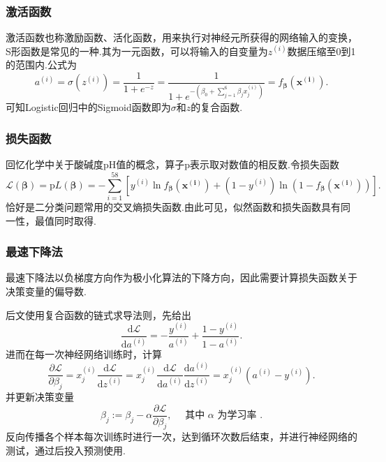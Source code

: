 \subsubsection{激活函数}

激活函数也称激励函数、活化函数，用来执行对神经元所获得的网络输入的变换，S形函数是常见的一种.其为一元函数，可以将输入的自变量为$z^{(i)}$数据压缩至0到1的范围内.公式为
\begin{equation}
	a^{(i)} = \sigma (z^{(i)}) = \frac{1}{1 + e^{- z}} = \frac{1}{1 + e^{-
   \left( \beta_0 + \sum^6_{j = 1} \beta_j x^{(i)}_j \right)}} =
   f_{\boldsymbol{\beta}} (\boldsymbol{x^{(i)}}).
\end{equation}
可知Logistic回归中的Sigmoid函数即为$\sigma$和$z$的复合函数.

\subsubsection{损失函数}

回忆化学中关于酸碱度pH值的概念，算子p表示取对数值的相反数.令损失函数
\begin{equation}
	\mathcal{L} (\boldsymbol{\beta}) = \mathrm{p} \textit{L$(\boldsymbol{\beta})$}
   = - \sum_{i = 1}^{58} [y^{(i)} \ln f_{\boldsymbol{\beta}}
   (\boldsymbol{x^{(i)}}) + (1 - y^{(i)}) \ln (1 - f_{\boldsymbol{\beta}}
   (\boldsymbol{x^{(i)}}))].
\end{equation}
恰好是二分类问题常用的交叉熵损失函数.由此可见，似然函数和损失函数具有同一性，最值同时取得.

\subsubsection{最速下降法}

最速下降法以负梯度方向作为极小化算法的下降方向，因此需要计算损失函数关于决策变量的偏导数.

后文使用复合函数的链式求导法则，先给出
\begin{equation}
	\frac{\mathrm{d} \mathcal{L}}{\mathrm{d} a^{(i)}} = -
   \frac{y^{(i)}}{a^{(i)}} + \frac{1 - y^{(i)}}{1 - a^{(i)}}.
\end{equation}
进而在每一次神经网络训练时，计算
\begin{equation}
	\frac{\partial \mathcal{L}}{\partial \beta_j} = x^{(i)}_j \frac{\mathrm{d}
   \mathcal{L}}{\mathrm{d}z^{(i)}} = x^{(i)}_j \frac{\mathrm{d}
   \mathcal{L}}{\mathrm{d} a^{(i)}} \frac{\mathrm{d} a^{(i)}}{\mathrm{d}z^{(i)}}
   = x^{(i)}_j (a^{(i)} - y^{(i)}).
\end{equation}
并更新决策变量
\begin{equation}
	\beta_{j}:=\beta_{j}-\alpha \frac{\partial \mathcal{L}}{\partial \beta_{j}}, \quad \text { 其中 } \alpha \text { 为学习率 }.
\end{equation}
反向传播各个样本每次训练时进行一次，达到循环次数后结束，并进行神经网络的测试，通过后投入预测使用.





